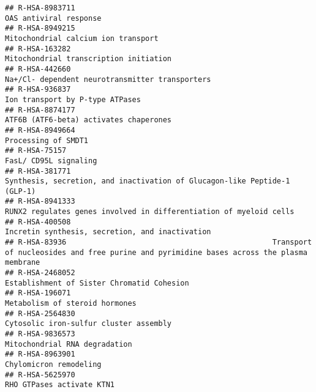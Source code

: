 \documentclass[
]{article}
\begin{document}
\begin{verbatim}
## R-HSA-8983711                                                                                                               OAS antiviral response
## R-HSA-8949215                                                                                                  Mitochondrial calcium ion transport
## R-HSA-163282                                                                                                Mitochondrial transcription initiation
## R-HSA-442660                                                                                       Na+/Cl- dependent neurotransmitter transporters
## R-HSA-936837                                                                                                       Ion transport by P-type ATPases
## R-HSA-8874177                                                                                               ATF6B (ATF6-beta) activates chaperones
## R-HSA-8949664                                                                                                                  Processing of SMDT1
## R-HSA-75157                                                                                                                  FasL/ CD95L signaling
## R-HSA-381771                                                             Synthesis, secretion, and inactivation of Glucagon-like Peptide-1 (GLP-1)
## R-HSA-8941333                                                                   RUNX2 regulates genes involved in differentiation of myeloid cells
## R-HSA-400508                                                                                       Incretin synthesis, secretion, and inactivation
## R-HSA-83936                                               Transport of nucleosides and free purine and pyrimidine bases across the plasma membrane
## R-HSA-2468052                                                                                           Establishment of Sister Chromatid Cohesion
## R-HSA-196071                                                                                                        Metabolism of steroid hormones
## R-HSA-2564830                                                                                               Cytosolic iron-sulfur cluster assembly
## R-HSA-9836573                                                                                                        Mitochondrial RNA degradation
## R-HSA-8963901                                                                                                               Chylomicron remodeling
## R-HSA-5625970                                                                                                            RHO GTPases activate KTN1

\end{verbatim}
\end{document}
